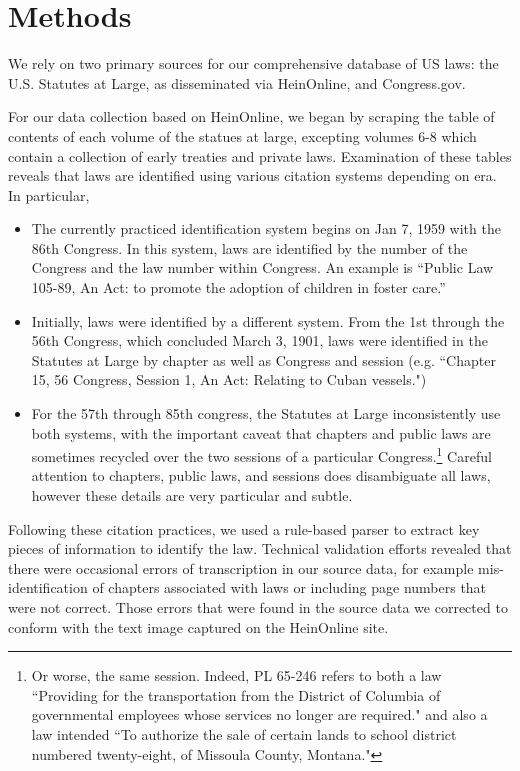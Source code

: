 \documentclass[fleqn,10pt]{wlscirep}
\begin{document}
\section*{Methods}

We rely on two primary sources for our comprehensive database of US laws: the U.S. Statutes at Large, as disseminated via HeinOnline, and Congress.gov. 

For our data collection based on HeinOnline, we began by scraping the table of contents of each volume of the statues at large, excepting volumes 6-8 which contain a collection of early treaties and private laws. Examination of these tables reveals that laws are identified using various citation systems depending on era. In particular,

\begin{itemize}
\item The currently practiced identification system begins on Jan 7, 1959 with the 86th Congress. In this system, laws are identified by the number of the Congress and the law number within Congress. An example is ``Public Law 105-89, An Act: to promote the adoption of children in foster care.'' 
\item Initially, laws were identified by a different system. From the 1st through the 56th Congress, which concluded March 3, 1901, laws were identified in the Statutes at Large by chapter as well as Congress and session (e.g. ``Chapter 15, 56 Congress, Session 1, An Act: Relating to Cuban vessels.") 
\item For the 57th through 85th congress, the Statutes at Large inconsistently use both systems, with the important caveat that chapters and public laws are sometimes recycled over the two sessions of a particular Congress.\footnote{Or worse, the same session. Indeed, PL 65-246 refers to both a law ``Providing for the transportation from the District of Columbia of governmental employees whose services no longer are required." and also a law intended ``To authorize the sale of certain lands to school district numbered twenty-eight, of Missoula County, Montana."} Careful attention to chapters, public laws, and sessions does disambiguate all laws, however these details are very particular and subtle. 
\end{itemize}

Following these citation practices, we used a rule-based parser to extract key pieces of information to identify the law. Technical validation efforts revealed that there were occasional errors of transcription in our source data, for example mis-identification of chapters associated with laws or including page numbers that were not correct. Those errors that were found in the source data we corrected to conform with the text image captured on the HeinOnline site. 
\end{document}

